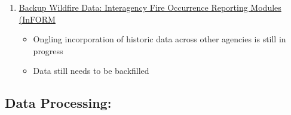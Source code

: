 \documentclass[11pt]{article}
\providecommand{\tightlist}{%
      \setlength{\itemsep}{0pt}\setlength{\parskip}{0pt}}
\begin{document}
\begin{enumerate}
  \begin{itemize}
  \tightlist
  \item
    Ecoregions mark areas of broadly similar ecosystems - a spatial
    framework for managing and comparing environmental resources across
    agencies
  \item
    Delineated from patterns across multiple factors (geology,
    vegetation, climate, soils, land use, wildlife, hydrology), weighted
    differently region to region
  \item
    Four Levels: Level I (15 regions, North America) → Level II (50) →
    Level III (85 in the conterminous US) → Level IV (further
    subdivisions)
  \end{itemize}
\item
  \href{https://in-form-nifc.hub.arcgis.com/pages/in-form-faqs}{Backup
  Wildfire Data: Interagency Fire Occurrence Reporting Modules (InFORM}

  \begin{itemize}
  \tightlist
  \item
    Ongling incorporation of historic data across other agencies is
    still in progress
  \item
    Data still needs to be backfilled
  \end{itemize}
\end{enumerate}

    \hypertarget{data-processing}{%
\subsection{Data Processing:}\label{data-processing}}
\end{document}
